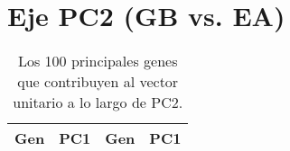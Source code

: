 
\chapter{Eje PC2 (GB vs. EA)}\label{apx:apx5}

	
	\begin{longtable}{|c|c||c|c|}
		\caption{Los 100 principales genes que contribuyen al vector unitario a lo largo de PC2.\label{tab:apx5}}\\
		
		\hline
		Gen & PC1 & Gen & PC1 \\ \hline
		\endhead
		

\end{longtable}

